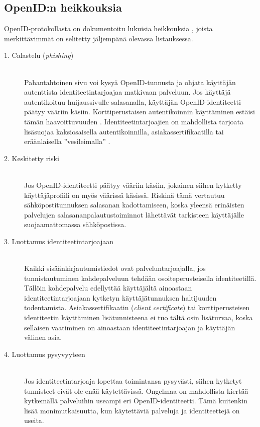 \documentclass{tktltiki}
\begin{document}
\subsection{OpenID:n heikkouksia}

OpenID-protokollasta on dokumentoitu lukuisia heikkouksia \cite{blackhat_openid_security_story, cameron_infocard_07, three_types_of_openid_ids_10}, joista merkittävimmät on selitetty jäljempänä olevassa listauksessa.

\begin{description}

  \item[1. Calastelu (\emph{phishing})] \hfill \\
    Pahantahtoinen sivu voi kysyä OpenID-tunnusta ja ohjata käyttäjän autenttista identiteetintarjoajaa matkivaan palveluun. Jos käyttäjä autentikoituu huijaussivulle salasanalla, käyttäjän OpenID-identiteetti päätyy vääriin käsiin. Korttiperustaisen autentikoinnin käyttäminen estäisi tämän haavoittuvuuden \cite{cameron_infocard_07}. Identiteetintarjoajien on mahdollista tarjoata lisäsuojaa kaksiosaisella autentikoinnilla, asiakassertifikaatilla tai eräänlaisella ''vesileimalla'' \cite{yahoo_phishing_seal}.

   \item[2. Keskitetty riski] \hfill \\
      Jos OpenID-identiteetti päätyy vääriin käsiin, jokainen siihen kytketty käyttäjäprofiili on myös väärissä
      käsissä. Riskinä tämä vertautuu sähköpostitunnuksen salasanan kadottamiseen, koska yleensä erinäisten
      palvelujen salasananpalautustoiminnot lähettävät tarkisteen käyttäjälle suojaamattomassa sähköpostissa.
   
   \item[3. Luottamus identiteetintarjoajaan] \hfill \\
      Kaikki sisäänkirjautumistiedot ovat palveluntarjoajalla, jos tunnistautuminen kohdepalveluun tehdään
      osoiteperusteisella identiteetillä. Tällöin kohdepalvelu edellyttää käyttäjältä
      ainoastaan identiteetintarjoajaan kytketyn käyttäjätunnuksen haltijuuden todentamista.
      Asiakassertifikaatin (\emph{client certificate}) tai korttiperusteisen identiteetin käyttäminen
      lisätunnisteena ei tuo tältä osin lisäturvaa, koska sellaisen vaatiminen on ainoastaan
      identiteetintarjoajan ja käyttäjän välinen asia.
      
   \item[4. Luottamus pysyvyyteen] \hfill \\
      Jos identiteetintarjoaja lopettaa toimintansa pysyvästi, siihen kytketyt tunnisteet eivät ole enää 
      käytettävissä. Ongelmaa on mahdollista kiertää kytkemällä palveluihin useampi eri OpenID-identiteetti. 
      Tämä kuitenkin lisää monimutkaisuutta, kun käytettäviä palveluja ja identiteettejä on useita.


\end{description}
\end{document}
